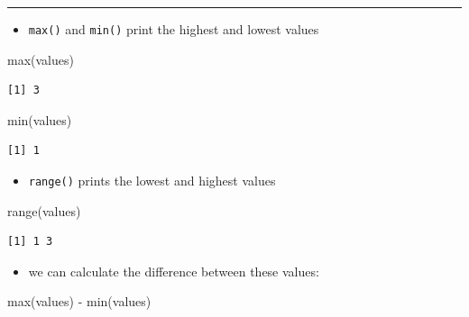 \documentclass[
  letterpaper,
  DIV=11]{scrartcl}
\newenvironment{Shaded}{\begin{snugshade}}{\end{snugshade}}
\newcommand{\FunctionTok}[1]{\textcolor[rgb]{0.28,0.35,0.67}{#1}}
\newcommand{\NormalTok}[1]{\textcolor[rgb]{0.00,0.23,0.31}{#1}}
\newcommand{\SpecialCharTok}[1]{\textcolor[rgb]{0.37,0.37,0.37}{#1}}
\providecommand{\tightlist}{%
  \setlength{\itemsep}{0pt}\setlength{\parskip}{0pt}}\usepackage{longtable,booktabs,array}
\begin{document}
\begin{center}\rule{0.5\linewidth}{0.5pt}\end{center}

\begin{itemize}
\tightlist
\item
  \texttt{max()} and \texttt{min()} print the highest and lowest values
\end{itemize}

\begin{Shaded}
\begin{Highlighting}[]
\FunctionTok{max}\NormalTok{(values)}
\end{Highlighting}
\end{Shaded}

\begin{verbatim}
[1] 3
\end{verbatim}

\begin{Shaded}
\begin{Highlighting}[]
\FunctionTok{min}\NormalTok{(values)}
\end{Highlighting}
\end{Shaded}

\begin{verbatim}
[1] 1
\end{verbatim}

\begin{itemize}
\tightlist
\item
  \texttt{range()} prints the lowest and highest values
\end{itemize}

\begin{Shaded}
\begin{Highlighting}[]
\FunctionTok{range}\NormalTok{(values)}
\end{Highlighting}
\end{Shaded}

\begin{verbatim}
[1] 1 3
\end{verbatim}

\begin{itemize}
\tightlist
\item
  we can calculate the difference between these values:
\end{itemize}

\begin{Shaded}
\begin{Highlighting}[]
\FunctionTok{max}\NormalTok{(values) }\SpecialCharTok{{-}} \FunctionTok{min}\NormalTok{(values)}
\end{Highlighting}
\end{Shaded}
\end{document}
